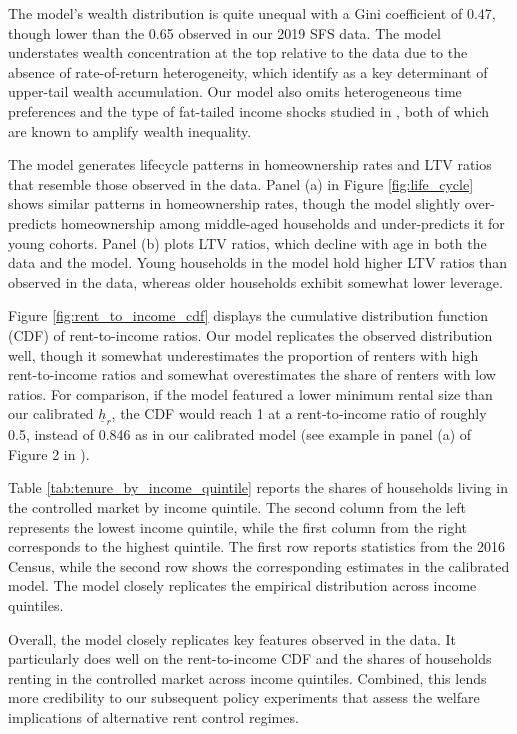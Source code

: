 \documentclass[parskip=full]{article}
\begin{document}
The model's wealth distribution is quite unequal with a Gini coefficient of 0.47, though lower than the 0.65 observed in our 2019 SFS data. The model understates wealth concentration at the top relative to the data due to the absence of rate-of-return heterogeneity, which \citet{fagereng} identify as a key determinant of upper-tail wealth accumulation. Our model also omits heterogeneous time preferences \citep{ks-1998} and the type of fat-tailed income shocks studied in \citet{mj-shocks}, both of which are known to amplify wealth inequality.

The model generates lifecycle patterns in homeownership rates and LTV ratios that resemble those observed in the data. Panel (a) in Figure \ref{fig:life_cycle} shows similar patterns in homeownership rates, though the model slightly over-predicts homeownership among middle-aged households and under-predicts it for young cohorts. Panel (b) plots LTV ratios, which decline with age in both the data and the model. Young households in the model hold higher LTV ratios than observed in the data, whereas older households exhibit somewhat lower leverage.

Figure \ref{fig:rent_to_income_cdf} displays the cumulative distribution function (CDF) of rent-to-income ratios. Our model replicates the observed distribution well, though it somewhat underestimates the proportion of renters with high rent-to-income ratios and somewhat overestimates the share of renters with low ratios. For comparison, if the model featured a lower minimum rental size than our calibrated $\underline{h}_{r}$, the CDF would reach 1 at a rent‑to‑income ratio of roughly 0.5, instead of 0.846 as in our calibrated model (see example in panel (a) of Figure 2 in \citet{rs-2023}).

Table \ref{tab:tenure_by_income_quintile} reports the shares of households living in the controlled market by income quintile. The second column from the left represents the lowest income quintile, while the first column from the right corresponds to the highest quintile. The first row reports statistics from the 2016 Census, while the second row shows the corresponding estimates in the calibrated model. The model closely replicates the empirical distribution across income quintiles.

Overall, the model closely replicates key features observed in the data. It particularly does well on the rent-to-income CDF and the shares of households renting in the controlled market across income quintiles. Combined, this lends more credibility to our subsequent policy experiments that assess the welfare implications of alternative rent control regimes.
\end{document}
